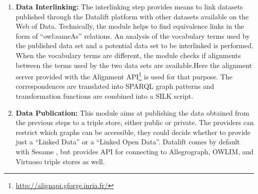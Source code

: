\begin{enumerate}
\item{\textbf{Data Interlinking:}}
The interlinking step provides means to link datasets published through the Datalift platform with other datasets available on the Web of Data. Technically, the module helps to find equivalence links in the form of ``owl:sameAs'' relations. An analysis of the vocabulary terms used by the published data set and a potential data set to be interlinked is performed. When the vocabulary terms are different, the module checks if alignments between the terms used by the two data sets are available.Here the alignment server provided with the Alignment API\footnote{\url{http://alignapi.gforge.inria.fr/}} is used for that purpose. The correspondences are translated into SPARQL graph patterns and transformation functions are combined into a SILK script.
\item{\textbf{Data Publication:}}
This module aims at publishing the data obtained from the previous steps to a triple store, either public or private. The providers can restrict which graphs can be accessible, they could decide whether to provide just a ``Linked Data'' or a ``Linked Open Data''. Datalift comes by default with Sesame , but provides API for connecting to Allegrograph, OWLIM, and Virtuoso triple stores as well.
\end{enumerate}


\begin{figure}[!htp]
\end{figure}

